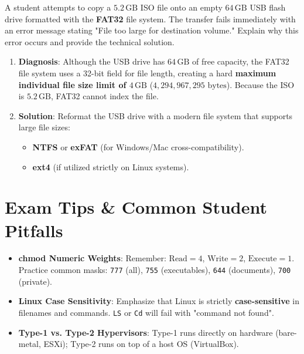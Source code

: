 \begin{example}
A student attempts to copy a $5.2\,\text{GB}$ ISO file onto an empty $64\,\text{GB}$ USB flash drive formatted with the \textbf{FAT32} file system. The transfer fails immediately with an error message stating "File too large for destination volume." Explain why this error occurs and provide the technical solution.

\begin{solutionbox}
\begin{enumerate}
    \item \textbf{Diagnosis}: Although the USB drive has $64\,\text{GB}$ of free capacity, the FAT32 file system uses a 32-bit field for file length, creating a hard \textbf{maximum individual file size limit of $4\,\text{GB}$} ($4{,}294{,}967{,}295\text{ bytes}$). Because the ISO is $5.2\,\text{GB}$, FAT32 cannot index the file.
    \item \textbf{Solution}: Reformat the USB drive with a modern file system that supports large file sizes:
    \begin{itemize}
        \item \textbf{NTFS} or \textbf{exFAT} (for Windows/Mac cross-compatibility).
        \item \textbf{ext4} (if utilized strictly on Linux systems).
    \end{itemize}
\end{enumerate}
\end{solutionbox}
\end{example}

\section{Exam Tips \& Common Student Pitfalls}

\begin{examtip}
\begin{itemize}
    \item \textbf{chmod Numeric Weights}: Remember: $\text{Read} = 4$, $\text{Write} = 2$, $\text{Execute} = 1$. Practice common masks: \texttt{777} (all), \texttt{755} (executables), \texttt{644} (documents), \texttt{700} (private).
    \item \textbf{Linux Case Sensitivity}: Emphasize that Linux is strictly \textbf{case-sensitive} in filenames and commands. \texttt{LS} or \texttt{Cd} will fail with "command not found".
    \item \textbf{Type-1 vs. Type-2 Hypervisors}: Type-1 runs directly on hardware (bare-metal, ESXi); Type-2 runs on top of a host OS (VirtualBox).
\end{itemize}
\end{examtip}

